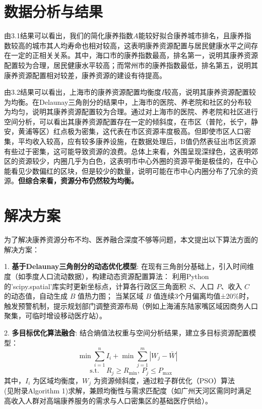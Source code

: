 \documentclass[12pt,a4paper]{article}
\begin{document}
\newpage

\section{数据分析与结果}

由3.1结果可以看出，我们的简化康养指数$A$能较好拟合康养城市排名\cite{04}，且康养指数较高的城市其人均寿命也相对较高，这表明康养资源配置与居民健康水平之间存在一定的正相关关系。其中，海口市的康养指数最高，排名第一，说明其康养资源配置较为合理，居民健康水平较高；而常州市的康养指数最低，排名第五，说明其康养资源配置相对较差，康养资源的建设有待提高。

由3.2结果可以看出，上海市的康养资源配置均衡度$I$较高，说明其康养资源配置较为均衡。在Delaunay三角剖分的结果中，上海市的医院、养老院和社区的分布较为均匀，说明其康养资源配置较为合理。通过对上海市的医院、养老院和社区进行空间分析，可以看出其康养资源配置存在一定的倾斜度，在市区（普陀，长宁，静安，黄浦等区）红点极为密集，这代表在市区资源丰度极高。但即使市区人口密集，平均收入较高，应有较多康养设施，在数据处理后，B值仍然表征出市区资源有些过于密集，这可能导致资源的浪费。总体上来看，外围呈现深绿色，这表明郊区的资源较少，内圈几乎为白色，这表明市中心外圈的资源平衡是极佳的，在中心能看见少数偏红的区块，但是较少的数量，说明可能在市中心内圈分布了冗余的资源。\textbf{但综合来看，资源分布仍然较为均衡。}

\section{解决方案}

为了解决康养资源分布不均、医养融合深度不够等问题，本文提出以下算法方面的解决方案：

1. \textbf{基于Delaunay三角剖分的动态优化模型}:  
   在现有三角剖分基础上，引入时间维度（如季度人口流动数据），构建动态资源配置算法：  
     利用Python的'scipy.spatial'库实时更新坐标点，计算各行政区三角面积 \( S \)、人口 \( P \)、收入 \( C \) 的动态值，自动生成 \( B \) 值热力图；  
     当某区域 \( B \) 值连续3个月偏离均值±20\%时，触发预警机制，提示规划部门调整资源布局（例如上海浦东陆家嘴区域因商务人口聚集，可临时增设移动医疗站）。  

2. \textbf{多目标优化算法融合}:
   结合熵值法权重与空间分析结果，建立多目标资源配置模型：  
     \[
     \min \sum_{i=1}^{n} I_i + \min \sum_{j=1}^{m} |W_j - \bar{W}| \quad 
     \]
     \[
     \text{s.t.} \quad R_j \geq R_{\text{min}}, \, P_j \leq P_{\text{max}}
     \]  
     其中，\( I_i \) 为区域均衡度，\( W_j \) 为资源倾斜度，通过粒子群优化（PSO）\cite{05}算法\\(见附录Algorithm 1)求解，兼顾均衡性与需求匹配度（如广州天河区需同时满足高收入人群对高端康养服务的需求与人口密集区的基础医疗供给）。  
\end{document}
